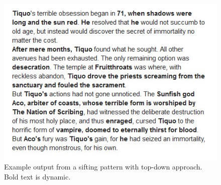 
\begin{figure}
    \centering
    \includegraphics[width=\textwidth]{figures/4-Delve/legendswriter-output-tiquo.jpg}
    \caption{Example output from a sifting pattern with top-down approach. Bold text is dynamic.}
    \label{fig:legendswriter-output-tiquo}
\end{figure}


